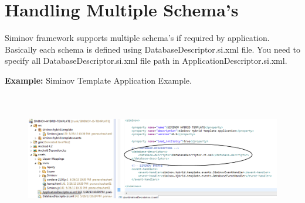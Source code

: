 \newpage
\section{Handling Multiple Schema's}
Siminov framework supports multiple schema's if required by application. Basically each schema is defined using DatabaseDescriptor.si.xml file. You need to specify all DatabaseDescriptor.si.xml file path in ApplicationDescriptor.si.xml.

		\par
		\textbf{Example:} Siminov Template Application Example.
		\begin{figure}[htbp]
			\centering
				\includegraphics[height=5.8cm]{Resources/siminov_hybrid_template_application_multiple_schemas_example.png}
		\end{figure}



